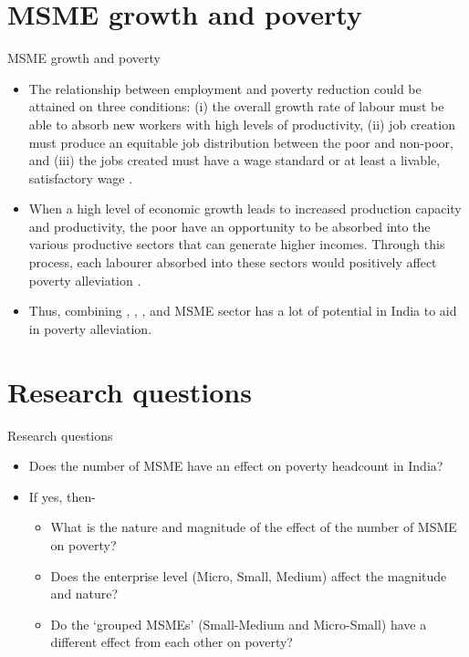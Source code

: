 \documentclass[10pt,aspectratio=169]{beamer}
\begin{document}
\section{MSME growth and poverty}
\begin{frame}{MSME growth and poverty}

\vspace{0.5cm}    
    \fontsize{10pt}{12pt}\selectfont
    \begin{itemize}
\item The relationship between employment and poverty reduction could be attained on three conditions: (i) the overall growth rate of labour must be able to absorb new workers with high levels of productivity, (ii) job creation must produce an equitable job distribution between the poor and non-poor, and (iii) the jobs created must have a wage standard or at least a livable, satisfactory wage \parencite{singh1999role}.
\item When a high level of economic growth leads to increased production capacity and productivity, the poor have an opportunity to be absorbed into the various productive sectors that can generate higher incomes. Through this process, each labourer absorbed into these sectors would positively affect poverty alleviation \parencite{islam2004nexus}.
\item Thus, combining \textcite{islam2004nexus}, \textcite{singh1999role}, \textcite{MSME2023}, and \textcite{purakala2020role} MSME sector has a lot of potential in India to aid in poverty alleviation.
\end{itemize}
\end{frame}

\section{Research questions}
\begin{frame}{Research questions}

\fontsize{12pt}{12pt}
\begin{itemize}
    \item Does the number of MSME have an effect on poverty headcount in India?
    \item If yes, then-
    \vspace{0.3cm}
    \begin{itemize}
    \item What is the nature and magnitude of the effect of the number of MSME on poverty?
    \item Does the enterprise level (Micro, Small, Medium) affect the magnitude and nature?
    \item Do the `grouped MSMEs' (Small-Medium and Micro-Small) have a different effect from each other on poverty?
    \end{itemize}
\end{itemize}  
\end{frame}
\end{document}
